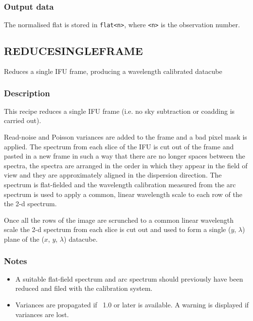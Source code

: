 \documentclass[twoside,11pt]{article}
\newcommand{\xref}[3]{#1}
\renewcommand{\_}{\texttt{\symbol{95}}}
\newcommand{\KAPPA}{\xref{{\sc{Kappa}}}{sun95}{}}
\begin{document}
\subsubsection*{Output data}

The normalised flat is stored in {\tt flat\_<n>}, where {\tt <n>} is
the observation number.

\clearpage

\subsection{REDUCE\_SINGLE\_FRAME}



Reduces a single IFU frame, producing a wavelength calibrated datacube

\subsubsection*{Description}

This recipe reduces a single IFU frame (i.e. no sky subtraction or
coadding is carried out).



Read-noise and Poisson variances are added to the frame and a bad
pixel mask is applied. The spectrum from each slice of the IFU is cut
out of the frame and pasted in a new frame in such a way that there
are no longer spaces between the spectra, the spectra are arranged in
the order in which they appear in the field of view and they are
approximately aligned in the dispersion direction. The spectrum is
flat-fielded and the wavelength calibration measured from the arc
spectrum is used to apply a common, linear wavelength scale to each
row of the the 2-d spectrum.



Once all the rows of the image are scrunched to a common linear wavelength 
scale the 2-d spectrum from each slice is cut out and used to form
a single ($y$, $\lambda$) plane of the ($x$, $y$, $\lambda$) datacube.

\subsubsection*{Notes}

\begin{itemize}
\item 
  
  A suitable flat-field spectrum and arc spectrum should previously
  have been reduced and filed with the calibration system.

\item 

Variances are propagated if \KAPPA\ 1.0 or later is available. A warning
is displayed if variances are lost.
\end{itemize}
\end{document}
